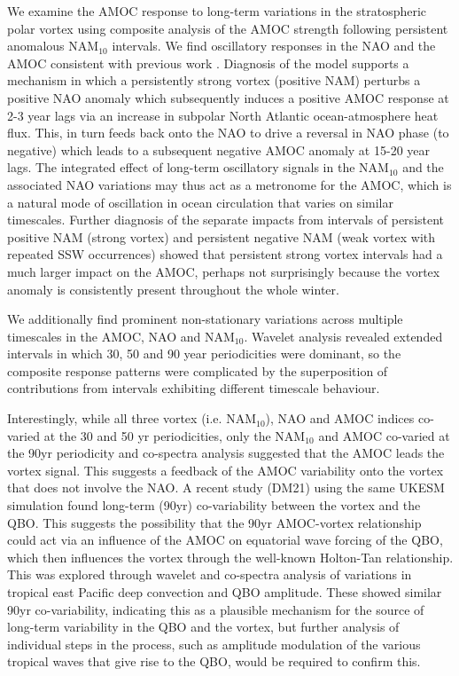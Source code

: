 We examine the AMOC response to long-term variations in the stratospheric polar vortex using composite analysis of the AMOC strength following persistent anomalous NAM$_{10}$ intervals. We find oscillatory responses in the NAO and the AMOC consistent with previous work \citep{reichlerStratospheric2012b}. Diagnosis of the model supports a mechanism in which a persistently strong vortex (positive NAM) perturbs a positive NAO anomaly which subsequently induces a positive AMOC response at 2-3 year lags via an increase in subpolar North Atlantic ocean-atmosphere heat flux. This, in turn feeds back onto the NAO to drive a reversal in  NAO phase (to negative) which leads to a subsequent negative AMOC anomaly at 15-20 year lags. The integrated effect of long-term oscillatory signals in the NAM$_{10}$ and the associated NAO variations may thus act as a metronome for the AMOC, which is a natural mode of oscillation in  ocean circulation that varies on similar timescales. Further diagnosis of the separate impacts from  intervals of persistent positive NAM (strong vortex) and persistent negative NAM (weak vortex with repeated SSW occurrences) showed that persistent strong vortex intervals had a much larger impact on the AMOC, perhaps not surprisingly because the vortex anomaly is consistently present throughout the whole winter.

We additionally find prominent non-stationary variations across multiple timescales in the AMOC, NAO and NAM$_{10}$. Wavelet analysis revealed extended intervals in  which 30, 50 and 90 year periodicities were dominant, so the composite response patterns were complicated by  the superposition of contributions from intervals exhibiting different timescale behaviour. 

Interestingly, while all three vortex (i.e. NAM$_{10}$), NAO and AMOC indices co-varied at the 30 and 50 yr periodicities, only the NAM$_{10}$ and AMOC co-varied at the 90yr periodicity and co-spectra analysis suggested that the AMOC leads the vortex signal. This suggests a feedback of the AMOC variability onto the vortex that does not involve the NAO. A recent study (DM21) using the same UKESM simulation found long-term (90yr) co-variability between the vortex and the QBO. This suggests the possibility that the 90yr AMOC-vortex relationship could act via an influence of the AMOC on equatorial wave forcing of the QBO, which then influences the vortex through the well-known Holton-Tan relationship.  This was explored through wavelet and co-spectra analysis of variations in tropical east Pacific deep convection and QBO amplitude. These showed similar 90yr co-variability, indicating this as a plausible mechanism for the source of long-term variability in the QBO and the vortex, but further analysis of individual steps in the process, such as  amplitude modulation of the various tropical waves that give rise to the QBO, would be required to confirm this.

